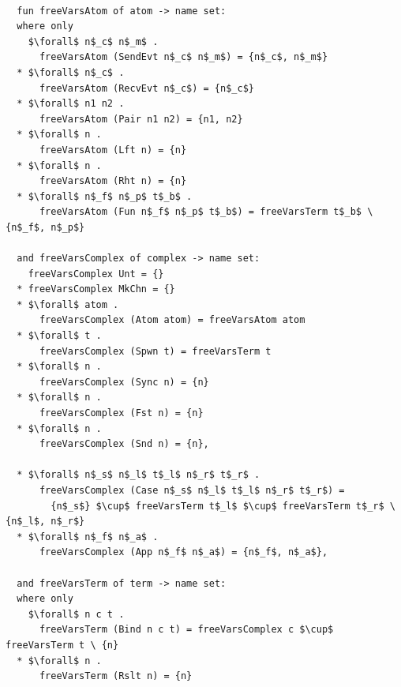 \documentclass[letterpaper, 11pt]{extarticle}
\begin{document}
\begin{lstlisting}[language=logic, mathescape]

  fun freeVarsAtom of atom -> name set:
  where only
    $\forall$ n$_c$ n$_m$ .
      freeVarsAtom (SendEvt n$_c$ n$_m$) = {n$_c$, n$_m$}
  * $\forall$ n$_c$ .
      freeVarsAtom (RecvEvt n$_c$) = {n$_c$}
  * $\forall$ n1 n2 .
      freeVarsAtom (Pair n1 n2) = {n1, n2}
  * $\forall$ n .
      freeVarsAtom (Lft n) = {n}
  * $\forall$ n .
      freeVarsAtom (Rht n) = {n}
  * $\forall$ n$_f$ n$_p$ t$_b$ .
      freeVarsAtom (Fun n$_f$ n$_p$ t$_b$) = freeVarsTerm t$_b$ \ {n$_f$, n$_p$}
  
  and freeVarsComplex of complex -> name set:
    freeVarsComplex Unt = {}
  * freeVarsComplex MkChn = {}
  * $\forall$ atom .
      freeVarsComplex (Atom atom) = freeVarsAtom atom
  * $\forall$ t .
      freeVarsComplex (Spwn t) = freeVarsTerm t
  * $\forall$ n .
      freeVarsComplex (Sync n) = {n}
  * $\forall$ n .
      freeVarsComplex (Fst n) = {n}
  * $\forall$ n .
      freeVarsComplex (Snd n) = {n},

  * $\forall$ n$_s$ n$_l$ t$_l$ n$_r$ t$_r$ .
      freeVarsComplex (Case n$_s$ n$_l$ t$_l$ n$_r$ t$_r$) = 
        {n$_s$} $\cup$ freeVarsTerm t$_l$ $\cup$ freeVarsTerm t$_r$ \ {n$_l$, n$_r$}
  * $\forall$ n$_f$ n$_a$ .
      freeVarsComplex (App n$_f$ n$_a$) = {n$_f$, n$_a$},
  
  and freeVarsTerm of term -> name set:
  where only
    $\forall$ n c t .
      freeVarsTerm (Bind n c t) = freeVarsComplex c $\cup$ freeVarsTerm t \ {n}
  * $\forall$ n .
      freeVarsTerm (Rslt n) = {n}


\end{lstlisting}
\end{document}
